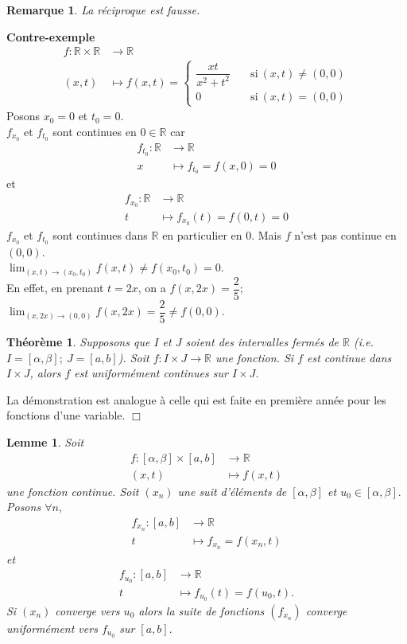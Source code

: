 \documentclass[11pt, a4paper]{book}
\newtheorem{teo}{Th\'eor\`eme}[section]
\newtheorem{rem}{Remarque}[section]
\newtheorem{lem}{Lemme}[section]
\newenvironment{pr}{\noindent {\bf Preuve} \noindent} {\hfill $\Box$\vskip 5mm}
\begin{document}
\begin{rem} La r\'eciproque est fausse.\end{rem}
\textbf{Contre-exemple} \begin{align*}
f:\mathbb{R}\times\mathbb{R}&\rightarrow\mathbb{R}\\ (x,t)&\mapsto f(x,t)=\begin{cases} \dfrac{xt}{x^2+t^2}&\quad \text{si}~(x,t)\neq(0,0)\\ 0&\quad \text{si}~(x,t)=(0,0) \end{cases}
\end{align*}
Posons $x_0=0$ et $t_0=0$. \\
$f_{x_0}$ et $f_{t_0}$ sont continues en $0\in \mathbb{R}$ car \begin{align*}
f_{t_0}:\mathbb{R}&\rightarrow\mathbb{R}\\ x&\mapsto f_{t_0}=f(x,0)=0
\end{align*} et \begin{align*}
f_{x_0}:\mathbb{R}&\rightarrow\mathbb{R}\\ t&\mapsto f_{x_0}(t)=f(0,t)=0
\end{align*}
$f_{x_0}$ et $f_{t_0}$ sont continues dans $\mathbb{R}$ en particulier en $0$. Mais $f$ n'est pas continue en $(0,0).$ \\ ${\displaystyle\lim_{(x,t)\rightarrow(x_0,t_0)}f(x,t)\neq	f(x_0,t_0)=0.}$\\ En effet, en prenant $t=2x$, on a $f(x,2x)=\dfrac{2}{5}$; ${\displaystyle\lim_{(x,2x)\rightarrow(0,0)}f(x,2x)=\dfrac{2}{5}\neq f(0,0)}.$ 
\begin{teo} \label{teo6.2.1}
Supposons que $I$ et $J$ soient des intervalles ferm\'es de $\mathbb{R}$ (i.e. $I=[\alpha,\beta];~J=[a,b]$). Soit $f:I\times J\rightarrow\mathbb{R}$ une fonction. Si $f$ est continue dans $I\times J$, alors $f$ est uniform\'ement continues sur $I\times J.$
\end{teo}
\begin{pr}\quad La d\'emonstration est analogue \`a celle qui est faite en premi\`ere ann\'ee pour les fonctions d'une variable.
\end{pr}
\begin{lem} \label{lem6.2.1} Soit \begin{align*}
f:[\alpha,\beta]\times[a,b]&\rightarrow\mathbb{R}\\ (x,t)&\mapsto f(x,t)
\end{align*} une fonction continue. Soit $(x_n)$ une suit d'\'el\'ements de $[\alpha,\beta]$ et $u_0\in [\alpha,\beta].$ Posons $\forall n,$ \begin{align*} f_{x_n}:[a,b]&\rightarrow\mathbb{R}\\ t&\mapsto f_{x_n}=f(x_n,t)\end{align*} et \begin{align*}
f_{u_0}:[a,b]&\rightarrow\mathbb{R}\\t&\mapsto f_{u_0}(t)= f(u_0,t).
\end{align*} Si $(x_n)$ converge vers $u_0$ alors la suite de fonctions $(f_{x_n})$ converge uniform\'ement vers $f_{u_0}$ sur $[a,b].$
\end{lem}
\end{document}
